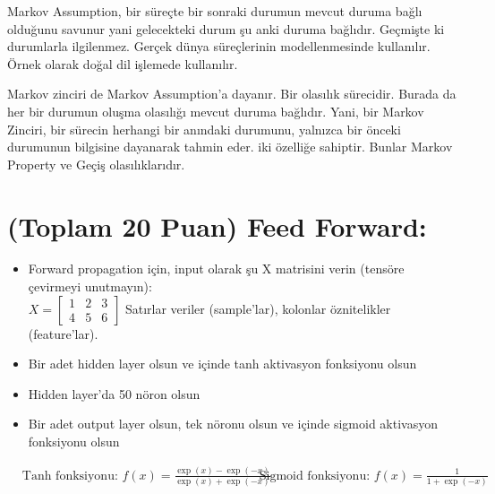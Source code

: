 \documentclass[11pt]{article}
\begin{document}
Markov Assumption, bir süreçte bir sonraki durumun mevcut duruma bağlı olduğunu savunur yani gelecekteki durum şu anki duruma bağlıdır. Geçmişte ki durumlarla ilgilenmez. Gerçek dünya süreçlerinin modellenmesinde kullanılır. Örnek olarak doğal dil işlemede kullanılır.

Markov zinciri de Markov Assumption'a dayanır. Bir olasılık sürecidir. Burada da her bir durumun oluşma olasılığı mevcut duruma bağlıdır. Yani, bir Markov Zinciri, bir sürecin herhangi bir anındaki durumunu, yalnızca bir önceki durumunun bilgisine dayanarak tahmin eder. iki özelliğe sahiptir. Bunlar Markov Property ve Geçiş olasılıklarıdır.


\section{(Toplam 20 Puan) Feed Forward:}
 
\begin{itemize}
    \item Forward propagation için, input olarak şu X matrisini verin (tensöre çevirmeyi unutmayın):\\
    $X = \begin{bmatrix}
        1 & 2 & 3\\
        4 & 5 & 6
        \end{bmatrix}$
    Satırlar veriler (sample'lar), kolonlar öznitelikler (feature'lar).
    \item Bir adet hidden layer olsun ve içinde tanh aktivasyon fonksiyonu olsun
    \item Hidden layer'da 50 nöron olsun
    \item Bir adet output layer olsun, tek nöronu olsun ve içinde sigmoid aktivasyon fonksiyonu olsun
\end{itemize}

\begin{comment}
Tanh fonksiyonu:\\
$f(x) = \frac{exp(x) - exp(-x)}{exp(x) + exp(-x)}$
\vspace{.2in}

Sigmoid fonksiyonu:\\
$f(x) = \frac{1}{1 + exp(-x)}$
\end{comment}

\begin{align*}
& \text{Tanh fonksiyonu: } f(x) = \frac{\exp(x) - \exp(-x)}{\exp(x) + \exp(-x)} \
& \text{Sigmoid fonksiyonu: } f(x) = \frac{1}{1 + \exp(-x)}
\end{align*}
\end{document}
